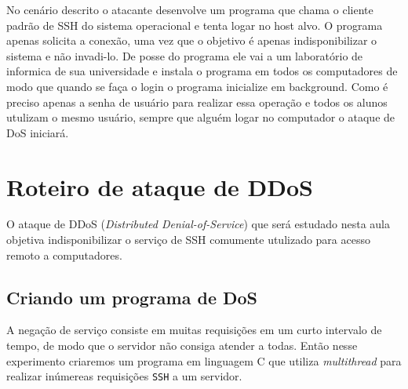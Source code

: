 \documentclass[12pt]{abnt}
\begin{document}
No cenário descrito o atacante desenvolve um programa que chama o cliente padrão de SSH do sistema operacional e tenta logar no host alvo. O programa
apenas solicita a conexão, uma vez que o objetivo é apenas indisponibilizar o sistema e não invadi-lo.
De posse do programa ele vai a um laboratório de informica de sua universidade e instala o programa em todos os computadores de modo que
quando se faça o login o programa inicialize em background. Como é preciso apenas a senha de usuário para realizar essa operação e todos
os alunos utulizam o mesmo usuário, sempre que alguém logar no computador o ataque de DoS iniciará.

\chapter{Roteiro de ataque de DDoS}

O ataque de DDoS (\textit{Distributed Denial-of-Service}) que será estudado nesta aula objetiva indisponibilizar o serviço de SSH comumente
utulizado para acesso remoto a computadores. 

\section{Criando um programa de DoS}
\label{programa}

A negação de serviço consiste em muitas requisições em um curto intervalo de tempo, de modo que o servidor não consiga atender a todas. Então nesse
experimento criaremos um programa em linguagem C que utiliza \textit{multithread} para realizar inúmereas requisições \texttt{SSH} a um servidor.
\end{document}

